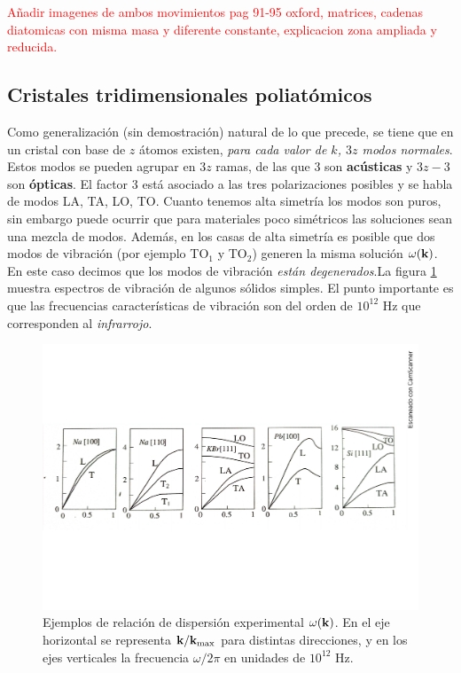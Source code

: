 \begin{Anotacion}
	\textcolor{red}{Añadir imagenes de ambos movimientos pag 91-95 oxford, matrices, cadenas diatomicas con misma masa y diferente constante, explicacion zona ampliada y reducida.}
\end{Anotacion}	

\subsection{Cristales tridimensionales poliatómicos}

Como generalización (sin demostración) natural de lo que precede, se tiene que en un cristal con base de $z$ átomos existen, \textit{para cada valor de $k$, $3z$ modos normales}. Estos modos se pueden agrupar en $3z$ ramas, de las que $3$ son \textbf{acústicas} y $3z-3$ son \textbf{ópticas}. El factor 3 está asociado a las tres polarizaciones posibles y se habla de modos LA, TA, LO, TO. Cuanto tenemos alta simetría los modos son puros, sin embargo puede ocurrir que para materiales poco simétricos las soluciones sean una mezcla de modos. Además, en los casas de alta simetría es posible que dos modos de vibración (por ejemplo TO$_1$ y TO$_2$) generen la misma solución $\omega(\mathbf{k})$. En este caso decimos que los modos de vibración \textit{están degenerados}.La figura \ref{Fig:04-07} muestra espectros de vibración de algunos sólidos simples. El punto importante es que las frecuencias características de vibración son del orden de $10^{12}$ Hz que corresponden al \textit{infrarrojo}.

\begin{figure}[h!] \centering
    \includegraphics[scale=0.42]{Cuerpo/Ch_04/Fotos libro 7.pdf}
    \caption{Ejemplos de relación de dispersión experimental $\omega (\mathbf{k})$. En el eje horizontal se representa $\mathbf{k}/\mathbf{k}_{\max}$ para distintas direcciones, y en los ejes verticales la frecuencia $\omega/2\pi$ en unidades de $10^{12}$ Hz.}
    \label{Fig:04-07}
\end{figure}    

